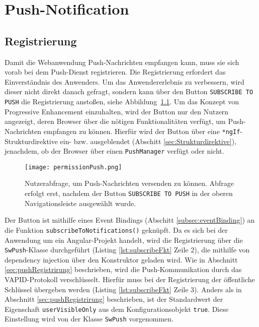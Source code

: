 \chapter{Push-Notification}\label{ch:PushNotifikation}

\section{Registrierung}

Damit die Webanwendung Push-Nachrichten empfangen kann, muss sie sich vorab bei dem Push-Dienst registrieren. Die Registrierung erfordert das Einverständnis des Anwenders. 
Um das Anwendererlebnis zu verbessern, wird dieser nicht direkt danach gefragt, sondern kann über den Button \texttt{SUBSCRIBE TO PUSH} die Registrierung anstoßen, siehe Abbildung~\ref{img:permissionPush}. Um das Konzept von Progressive Enhancement einzuhalten, wird der Button nur den Nutzern angezeigt, deren Browser über die nötigen Funktionalitäten verfügt, um Push-Nachrichten empfangen zu können. Hierfür wird der Button über eine \texttt{*ngIf}-Strukturdirektive ein- bzw. ausgeblendet (Abschitt \ref{sec:Strukturdirektive}), jenachdem, ob der Browser über einen \texttt{PushManager} verfügt oder nicht. 

\begin{figure}[!htb]
    \centering
    \texttt{[image: permissionPush.png]}
    \caption{Nutzerabfrage, um Push-Nachrichten versenden zu können. Abfrage erfolgt erst, nachdem der Button \texttt{SUBSCRIBE TO PUSH} in der oberen Navigationsleiste ausgewählt wurde.}
    \label{img:permissionPush}
\end{figure}

Der Button ist mithilfe eines Event Bindings (Abschitt \ref{subsec:eventBinding}) an die Funktion \linebreak\texttt{subscribeToNotifications()} geknüpft. Da es sich bei der Anwendung um ein Angular-Projekt handelt, wird die Registrierung über die \texttt{SwPush}-Klasse durchgeführt (Listing \ref{lst:subscribeFkt} Zeile 2), die mithilfe von dependency injection über den Konstruktor geladen wird. Wie in Abschnitt \ref{sec:pushRegistrirung} beschrieben, wird die Push-Kommunikation durch das VAPID-Protokoll verschlüsselt. Hierfür muss bei der Registrierung der öffentliche Schlüssel übergeben werden (Listing \ref{lst:subscribeFkt} Zeile 3). Anders als in Abschnitt \ref{sec:pushRegistrirung} beschrieben, ist der Standardwert der Eigenschaft \texttt{userVisibleOnly} aus dem Konfigurationsobjekt \texttt{true}. Diese Einstellung wird von der Klasse \texttt{SwPush} vorgenommen. 

